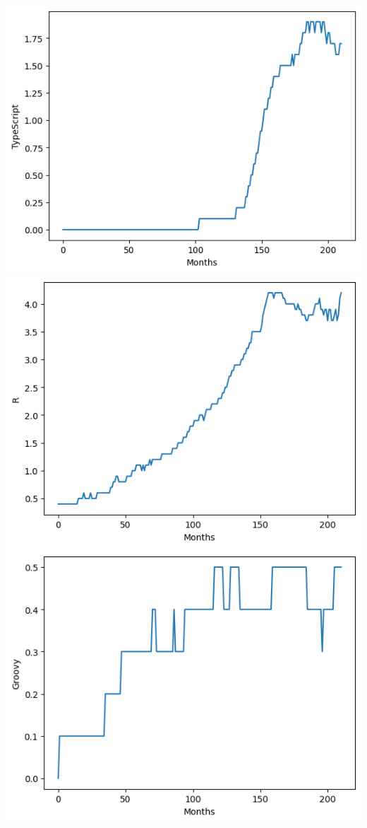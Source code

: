 \documentclass[conference]{IEEEtran}
\begin{document}
\noindent
\includegraphics[scale=0.4]{lineplot/typescript.png}
\includegraphics[scale=0.4]{lineplot/r.png}
\includegraphics[scale=0.4]{lineplot/groovy.png}
\end{document}
